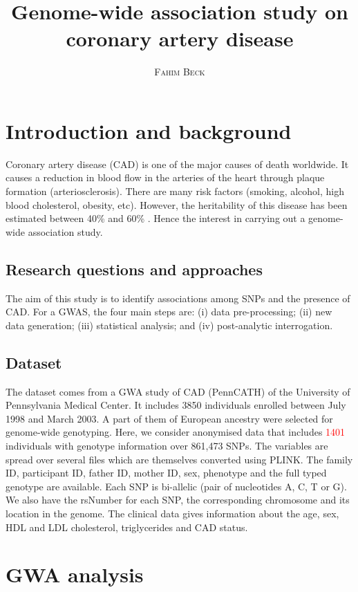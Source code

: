 \documentclass[a4paper, 12pt]{article}
\title{Genome-wide association study on coronary artery disease \vspace{0.3cm}} %
\author{\smallskip
\large \textsc{Fahim Beck}}
\date{\vspace{-1.3cm}}
\begin{document}
\maketitle

\section{Introduction and background}

Coronary artery disease (CAD) is one of the major causes of death worldwide. It causes a reduction in blood flow in the arteries of the heart through plaque formation (arteriosclerosis). There are many risk factors (smoking, alcohol, high blood cholesterol, obesity, etc). However, the heritability of this disease has been estimated between 40\% and 60\% \citep{heredity}. Hence the interest in carrying out a genome-wide association study.  

\subsection{Research questions and approaches}

The aim of this study is to identify associations among SNPs and the presence of CAD. For a GWAS, the four main steps are: (i) data pre-processing; (ii) new data generation; (iii) statistical analysis; and (iv) post-analytic interrogation. 

\subsection{Dataset}

The dataset comes from a GWA study of CAD (PennCATH) of the University of Pennsylvania Medical Center. It includes 3850 individuals enrolled between July 1998 and March 2003. A part of them of European ancestry were selected for genome-wide genotyping. Here, we consider anonymised data that includes \textcolor{red}{1401} individuals with genotype information over 861,473 SNPs. The variables are spread over several files which are themselves converted using PLINK. The family ID, participant ID, father ID, mother ID, sex, phenotype and the full typed genotype are available. Each SNP is bi-allelic (pair of nucleotides A, C, T or G). We also have the rsNumber for each SNP, the corresponding chromosome and its location in the genome. The clinical data gives information about the age, sex, HDL and LDL cholesterol, triglycerides and CAD status. 

\section{GWA analysis}
\end{document}
